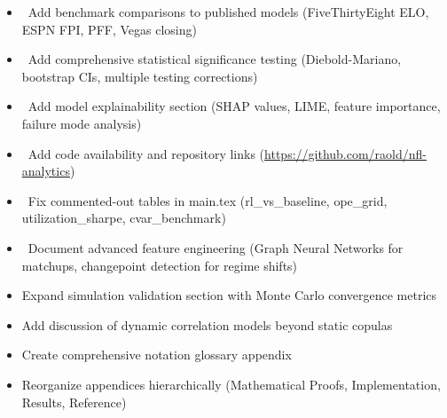 
\begin{itemize}
  \item {} \done\ Add benchmark comparisons to published models (FiveThirtyEight ELO, ESPN FPI, PFF, Vegas closing)
  \item {} \done\ Add comprehensive statistical significance testing (Diebold-Mariano, bootstrap CIs, multiple testing corrections)
  \item {} \done\ Add model explainability section (SHAP values, LIME, feature importance, failure mode analysis)
  \item {} \done\ Add code availability and repository links (\url{https://github.com/raold/nfl-analytics})
  \item {} \done\ Fix commented-out tables in main.tex (rl\_vs\_baseline, ope\_grid, utilization\_sharpe, cvar\_benchmark)
  \item {} \wip\ Document advanced feature engineering (Graph Neural Networks for matchups, changepoint detection for regime shifts)
  \item {} Expand simulation validation section with Monte Carlo convergence metrics
  \item {} Add discussion of dynamic correlation models beyond static copulas
  \item {} Create comprehensive notation glossary appendix
  \item {} Reorganize appendices hierarchically (Mathematical Proofs, Implementation, Results, Reference)
\end{itemize}

